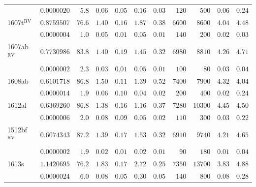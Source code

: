 \begin{table}
\begin{tabular}{@{}l *{10}{r} }
 & $ 0.0000020$  & $       5.8$  & $      0.06$  & $      0.05$  & $      0.16$  & $      0.03$  & $120$  & $500$  & $      0.06$  & $      0.24$  \\
\noalign{\smallskip}
1607t$^\mathrm{RV}$ & $ 0.8759507$  & $      76.6$  & $      1.40$  & $      0.16$  & $      1.87$  & $      0.38$  & $6600$  & $8600$  & $      4.04$  & $      4.48$  \\
 & $ 0.0000004$  & $       1.0$  & $      0.05$  & $      0.01$  & $      0.05$  & $      0.01$  & $140$  & $200$  & $      0.02$  & $      0.03$  \\
\noalign{\smallskip}
1607ab$^\mathrm{RV}$ & $ 0.7730986$  & $      83.8$  & $      1.40$  & $      0.19$  & $      1.45$  & $      0.32$  & $6980$  & $8810$  & $      4.26$  & $      4.71$  \\
 & $ 0.0000002$  & $       2.3$  & $      0.03$  & $      0.01$  & $      0.05$  & $      0.01$  & $100$  & $80$  & $      0.03$  & $      0.04$  \\
\noalign{\smallskip}
1608ab & $ 0.6101718$  & $      86.8$  & $      1.50$  & $      0.11$  & $      1.39$  & $      0.52$  & $7400$  & $7900$  & $      4.32$  & $      4.04$  \\
 & $ 0.0000014$  & $       1.9$  & $      0.06$  & $      0.10$  & $      0.04$  & $      0.02$  & $200$  & $400$  & $      0.02$  & $      0.24$  \\
\noalign{\smallskip}
1612al & $ 0.6369260$  & $      86.8$  & $      1.38$  & $      0.16$  & $      1.16$  & $      0.37$  & $7280$  & $10300$  & $      4.45$  & $      4.50$  \\
 & $ 0.0000006$  & $       2.0$  & $      0.08$  & $      0.09$  & $      0.05$  & $      0.02$  & $110$  & $300$  & $      0.03$  & $      0.22$  \\
\noalign{\smallskip}
1512bf$^\mathrm{RV}$ & $ 0.6074343$  & $      87.2$  & $      1.39$  & $      0.17$  & $      1.53$  & $      0.32$  & $6910$  & $9740$  & $      4.21$  & $      4.65$  \\
 & $ 0.0000002$  & $       1.9$  & $      0.02$  & $      0.01$  & $      0.02$  & $      0.01$  & $90$  & $180$  & $      0.01$  & $      0.04$  \\
\noalign{\smallskip}
1613s & $ 1.1420695$  & $      76.2$  & $      1.83$  & $      0.17$  & $      2.72$  & $      0.25$  & $7350$  & $13700$  & $      3.83$  & $      4.88$  \\
 & $ 0.0000024$  & $       6.0$  & $      0.08$  & $      0.05$  & $      0.30$  & $      0.05$  & $140$  & $800$  & $      0.08$  & $      0.28$  \\

\end{tabular}
\end{table}
